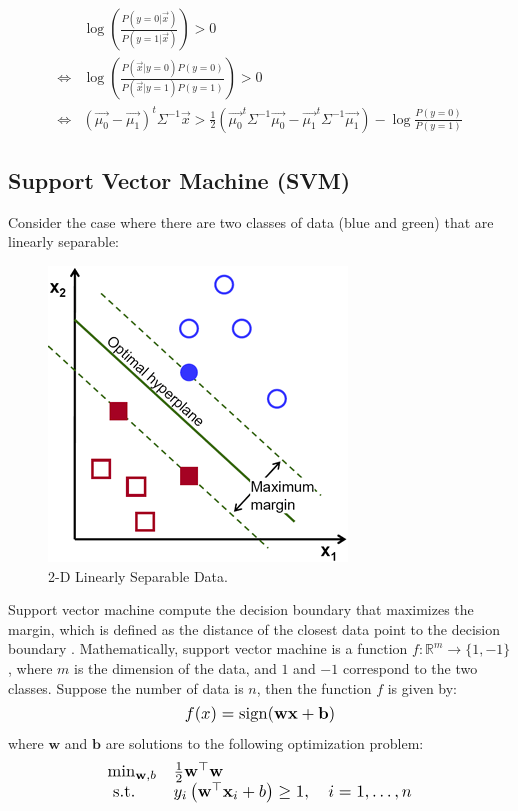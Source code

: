 \begin{equation*}
\begin{split}
    & \log\left( \frac{P(y=0 | \Vec{x})}{P(y=1 | \Vec{x})} \right)  > 0 \\
    \iff & \log\left( \frac{P(\Vec{x}| y = 0) P(y = 0)}{P(\Vec{x}| y = 1) P(y = 1)} \right) > 0 \\
    \iff & (\Vec{\mu_0} - \Vec{\mu_1})^t \Sigma ^{-1} \Vec{x} > \frac{1}{2} (\Vec{\mu_0}^{t} \Sigma^{-1} \Vec{\mu_0} - \Vec{\mu_1}^{t} \Sigma^{-1} \Vec{\mu_1} ) -\log \frac{P(y=0)}{P(y=1)}
\end{split}    
\end{equation*}



\subsection{Support Vector Machine (SVM)}

Consider the case where there are two classes of data (blue and green) that are linearly separable:

\begin{figure}[H]
    \centering
    \includegraphics[scale=2.0]{images/svm.png}
    \caption{2-D Linearly Separable Data.}
    \label{ls-svm}
\end{figure}

\noindent Support vector machine compute the decision boundary that maximizes the margin, which is defined as the distance of the closest data point to the decision boundary \cite{Cortes95support-vectornetworks}. Mathematically, support vector machine is a function $f: \mathbb{R}^m \rightarrow \{1,-1\}$, where $m$ is the dimension of the data, and $1$ and $-1$ correspond to the two classes. Suppose the number of data is $n$, then the function $f$ is given by:
$$\Scale[1.2]{f(x) = \text{sign} (\mathbf{w}\mathbf{x}+\mathbf{b})}$$ where $\mathbf{w}$ and $\textbf{b}$ are solutions to the following optimization problem:
$$\Scale[1.2]{\begin{array}{ll}{\min _{\mathbf{w}, b}} & {\frac{1}{2} \mathbf{w}^{\top} \mathbf{w}} \\ {\text { s.t. }} & {y_{i}\left(\mathbf{w}^{\top} \mathbf{x}_{i}+b\right) \geq 1, \quad i=1, \ldots, n }\end{array}} $$

